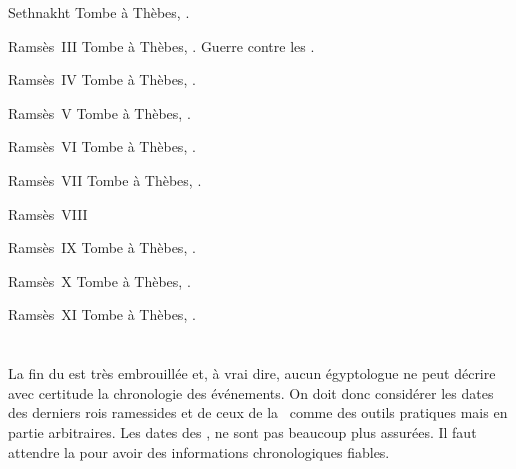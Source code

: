 \begin{listerois}
  \item [Sethnakht \datation{(c.~\anorange{1185}{1183})}] 
        Tombe à Thèbes, . 
  \item [Ramsès~III \datation{(c.~\anorange{1183}{1152})}] 
        Tombe à Thèbes, . 
        Guerre contre les .
  \item [Ramsès~IV \datation{(c.~\anorange{1152}{1145})}] 
        Tombe à Thèbes, . 
  \item [Ramsès~V \datation{(c.~\anorange{1145}{1142})}] 
        Tombe à Thèbes, . 
  \item [Ramsès~VI \datation{(c.~\anorange{1142}{1134})}] 
        Tombe à Thèbes, . 
  \item [Ramsès~VII \datation{(c.~\anorange{1134}{1126})}] 
        Tombe à Thèbes, . 
  \item [Ramsès~VIII \datation{(c.~\anorange{1126}{1125})}] 
  \item [Ramsès~IX \datation{(c.~\anorange{1125}{1107})}] 
        Tombe à Thèbes, . 
  \item [Ramsès~X \datation{(c.~\anorange{1107}{1099})}] 
        Tombe à Thèbes, . 
  \item [Ramsès~XI \datation{(c.~\anorange{1099}{1069})}] 
        Tombe à Thèbes, . 
\end{listerois}

\section{\TPI}

La fin du \NK est très embrouillée et, à vrai dire, aucun égyptologue 
ne peut décrire avec certitude la chronologie des événements. On doit 
donc considérer les dates des derniers rois ramessides et de ceux de 
la~ comme des outils pratiques mais en partie arbitraires. 
Les dates des ,  ne sont pas beaucoup plus 
assurées. Il faut attendre la  pour avoir des informations 
chronologiques fiables.

\subsection{\texorpdfstring{}{XXIe dynastie}}


